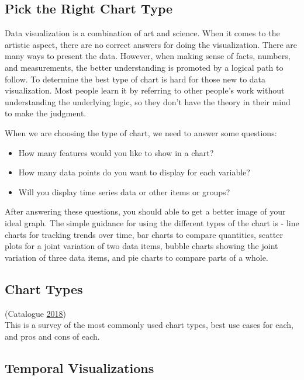 \documentclass[]{book}
\providecommand{\tightlist}{%
  \setlength{\itemsep}{0pt}\setlength{\parskip}{0pt}}
\begin{document}
\hypertarget{pick-the-right-chart-type}{%
\subsection{Pick the Right Chart Type}\label{pick-the-right-chart-type}}

Data visualization is a combination of art and science. When it comes to the artistic aspect, there are no correct answers for doing the visualization. There are many ways to present the data. However, when making sense of facts, numbers, and measurements, the better understanding is promoted by a logical path to follow. To determine the best type of chart is hard for those new to data visualization. Most people learn it by referring to other people's work without understanding the underlying logic, so they don't have the theory in their mind to make the judgment.

When we are choosing the type of chart, we need to answer some questions:

\begin{itemize}
\tightlist
\item
  How many features would you like to show in a chart?
\item
  How many data points do you want to display for each variable?
\item
  Will you display time series data or other items or groups?
\end{itemize}

After answering these questions, you should able to get a better image of your ideal graph. The simple guidance for using the different types of the chart is - line charts for tracking trends over time, bar charts to compare quantities, scatter plots for a joint variation of two data items, bubble charts showing the joint variation of three data items, and pie charts to compare parts of a whole.

\hypertarget{chart-types}{%
\subsection{Chart Types}\label{chart-types}}

(Catalogue \protect\hyperlink{ref-charts_viz}{2018})\\
This is a survey of the most commonly used chart types, best use cases for each, and pros and cons of each.

\hypertarget{temporal-visualizations}{%
\subsection{Temporal Visualizations}\label{temporal-visualizations}}
\end{document}
